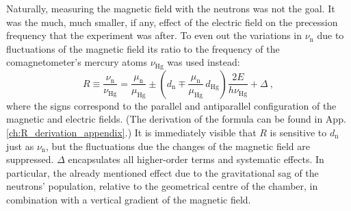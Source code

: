 Naturally, measuring the magnetic field with the neutrons was not the goal. It was the much, much smaller, if any, effect of the electric field on the precession frequency that the experiment was after. To even out the variations in $\nu_\text{n}$ due to fluctuations of the magnetic field its ratio to the frequency of the comagnetometer's mercury atoms $\nu_\text{Hg}$ was used instead:
\begin{equation}
  \label{eq:Rdefinition}
  R \equiv \frac{\nu_\text{n}}{\nu_\text{Hg}} = \frac{\mu_\text{n}}{\mu_\text{Hg}} \pm \left( d_\text{n} \mp \frac{\mu_\text{n}}{\mu_\text{Hg}} \, d_\text{Hg} \right) \frac{2 E}{ h  \nu_\text{Hg}} + \Delta \ ,
\end{equation}
where the signs correspond to the parallel and antiparallel configuration of the magnetic and electric fields. (The derivation of the formula can be found in App.\,\ref{ch:R_derivation_appendix}.)
It is immediately visible that $R$ is sensitive to $d_\text{n}$ just as $\nu_\text{n}$, but the fluctuations due the changes of the magnetic field are suppressed.
$\Delta$ encapsulates all higher-order terms and systematic effects. In particular, the already mentioned effect due to the gravitational sag of the neutrons' population, relative to the geometrical centre of the chamber, in combination with a vertical gradient of the magnetic field.



